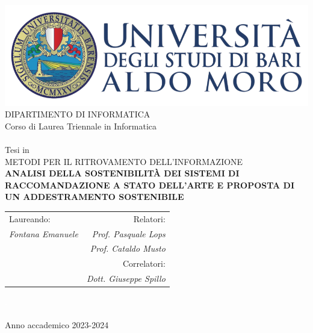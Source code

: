 \begin{titlepage}
    \begin{center}
        \includegraphics[scale=0.5]{images/uniba-logo.png}\\
        \vspace{0.5cm}
        {\large DIPARTIMENTO DI INFORMATICA}\\
        \vspace{0.5cm}
        {\large Corso di Laurea Triennale in Informatica}\\
        \hrulefill \\
        \vspace{0.5cm}
        {\large Tesi in}\\
        \vspace{0.5cm}
        {\large METODI PER IL RITROVAMENTO DELL'INFORMAZIONE}\\
        \vspace{0.5cm}
        {\LARGE \textbf{ANALISI DELLA SOSTENIBILITÀ DEI SISTEMI DI RACCOMANDAZIONE A STATO DELL'ARTE E PROPOSTA DI UN ADDESTRAMENTO SOSTENIBILE}}
        \\ %
        \vspace{0.5cm}

        \vfill
        \centering
        \begin{tabularx}{\textwidth}{@{}Xr@{}}
          {\large Laureando:} & {\large Relatori:} \\ 
          {\large \textit{Fontana Emanuele}} & {\large \textit{Prof. Pasquale Lops}} \\ 
          {} & {\large \textit{Prof. Cataldo Musto}} \\ 
          {}  & {\large Correlatori:} \\
          {}  & {\large \textit{Dott. Giuseppe Spillo}} \\ 
        \end{tabularx}
        \textcolor{white}{.} \\ 
        \vspace{0.5cm}
        \hrulefill \\
        {\large Anno accademico 2023-2024}
    \end{center}
\end{titlepage}